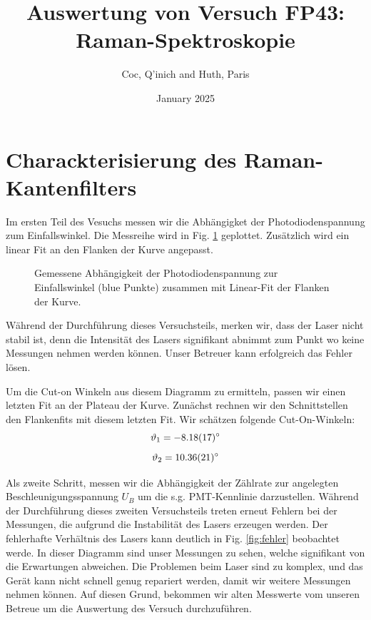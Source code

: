\documentclass[11 pt]{article}
\title{Auswertung von Versuch FP43: Raman-Spektroskopie}
\author{Coc, Q'inich and Huth, Paris}
\date{January 2025}
\begin{document}
\maketitle
\section{Charackterisierung des Raman-Kantenfilters}
Im ersten Teil des Vesuchs messen wir  die Abhängigket der Photodiodenspannung zum Einfallswinkel. Die Messreihe wird in Fig. \ref{fig:justierung} geplottet. Zusätzlich wird ein linear Fit an den Flanken der Kurve angepasst. 

\begin{figure}[htbp]
	\centering
   \caption{Gemessene Abhängigkeit der Photodiodenspannung zur Einfallswinkel (blue Punkte) zusammen mit Linear-Fit der Flanken der Kurve.}
   \label{fig:justierung}
\end{figure}

Während der Durchführung dieses Versuchsteils, merken wir, dass der Laser nicht stabil ist, denn die Intensität des Lasers signifikant abnimmt zum Punkt wo keine Messungen nehmen werden können. Unser Betreuer kann erfolgreich das Fehler lösen. 

Um die Cut-on Winkeln aus diesem Diagramm zu ermitteln, passen wir einen letzten Fit an der Plateau der Kurve. Zunächst rechnen wir den Schnittstellen den Flankenfits mit diesem letzten Fit. Wir schätzen folgende Cut-On-Winkeln:
$$\vartheta_1 =  \SI{-8.18\pm 0.17}{\degree}$$ 
$$\vartheta_2 =  \SI{10.36\pm 0.21}{\degree}$$ 

Als zweite Schritt, messen wir die Abhängigkeit der Zählrate zur  angelegten Beschleunigungsspannung $U_B$ um die s.g. PMT-Kennlinie darzustellen. Während der Durchführung dieses zweiten Versuchsteils treten erneut Fehlern bei der Messungen, die aufgrund die Instabilität des Lasers erzeugen werden. Der fehlerhafte Verhältnis des Lasers kann deutlich in Fig. \ref{fig:fehler} beobachtet werde. In dieser Diagramm sind unser Messungen zu sehen, welche signifikant von die Erwartungen abweichen. Die Problemen beim Laser sind zu komplex, und das Gerät kann nicht schnell genug repariert werden, damit wir weitere Messungen nehmen können. Auf diesen Grund, bekommen wir alten Messwerte vom unseren Betreue um die Auswertung des Versuch durchzuführen.  
\end{document}
